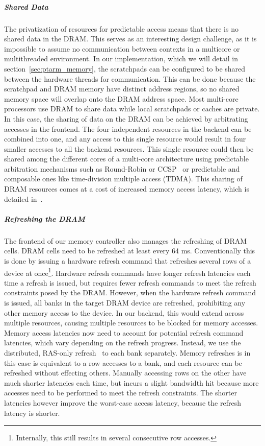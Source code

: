 \subparagraph{Shared Data}
The privatization of resources for predictable access means that there is no shared data in the DRAM.
This serves as an interesting design challenge, as it is impossible to assume no communication between contexts in a multicore or multithreaded environment.
In our implementation, which we will detail in section~\ref{sec:ptarm_memory}, the scratchpads can be configured to be shared between the hardware threads for communication.  
This can be done because the scratchpad and DRAM memory have distinct address regions, so no shared memory space will overlap onto the DRAM address space. 
Most multi-core processors use DRAM to share data while local scratchpads or caches are private.
In this case, the sharing of data on the DRAM can be achieved by arbitrating accesses in the frontend.
The four independent resources in the backend can be combined into one, and any access to this single resource would result in four smaller accesses to all the backend resources. 
This single resource could then be shared among the different cores of a multi-core architecture using predictable arbitration mechanisms such as Round-Robin or CCSP~\cite{Akesson08} or predictable and composable ones like time-division multiple access (TDMA). 
This sharing of DRAM resources comes at a cost of increased memory access latency, which is detailed in~\cite{ReinekeLiuPatelKimLee11_PRETDRAMControllerBankPrivatizationForPredictability}. 

\subparagraph{Refreshing the DRAM}
The frontend of our memory controller also manages the refreshing of DRAM cells. 
DRAM cells need to be refreshed at least every 64 ms.
Conventionally this is done by issuing a hardware refresh command that refreshes several rows of a device at once\footnote{Internally, this still results in several consecutive row accesses.}.
Hardware refresh commands have longer refresh latencies each time a refresh is issued, but requires fewer refresh commands to meet the refresh constraints posed by the DRAM.
However, when the hardware refresh command is issued, all banks in the target DRAM device are refreshed, prohibiting any other memory access to the device.
In our backend, this would extend across multiple resources, causing multiple resources to be blocked for memory accesses. 
Memory access latencies now need to account for potential refresh command latencies, which vary depending on the refresh progress.  
Instead, we use the distributed, RAS-only refresh~\cite{spec:micronddr2} to each bank separately.
Memory refreshes is in this case is equivalent to a row accesses to a bank, and each resource can be refreshed without effecting others.
Manually accessing rows on the other have much shorter latencies each time, but incurs a slight bandwidth hit because more accesses need to be performed to meet the refresh constraints.
The shorter latencies however improve the worst-case access latency, because the refresh latency is shorter.

